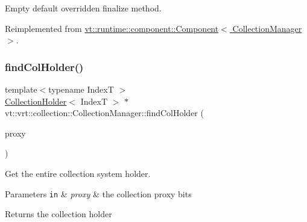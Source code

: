 Empty default overridden finalize method. 



Reimplemented from \hyperlink{structvt_1_1runtime_1_1component_1_1_component_a098e362de01af6054e5491fba671a959}{vt\+::runtime\+::component\+::\+Component$<$ Collection\+Manager $>$}.

\mbox{\label{structvt_1_1vrt_1_1collection_1_1_collection_manager_ad27604b811c2e8e5734c8dcfb772f1cb}} 
\subsubsection{\texorpdfstring{find\+Col\+Holder()}{findColHolder()}}
{\footnotesize\ttfamily template$<$typename IndexT $>$ \\
\hyperlink{structvt_1_1vrt_1_1collection_1_1_collection_holder}{Collection\+Holder}$<$ IndexT $>$ $\ast$ vt\+::vrt\+::collection\+::\+Collection\+Manager\+::find\+Col\+Holder (\begin{DoxyParamCaption}\item[{\hyperlink{namespacevt_a1b417dd5d684f045bb58a0ede70045ac}{Virtual\+Proxy\+Type} const \&}]{proxy }\end{DoxyParamCaption})\hspace{0.3cm}{\ttfamily [private]}}



Get the entire collection system holder. 


\begin{DoxyParams}[1]{Parameters}
\mbox{\tt in}  & {\em proxy} & the collection proxy bits\\
\hline
\end{DoxyParams}
\begin{DoxyReturn}{Returns}
the collection holder 
\end{DoxyReturn}
\mbox{\label{structvt_1_1vrt_1_1collection_1_1_collection_manager_a68b1f940a90a063268c1de9b2d16a02c}} 
